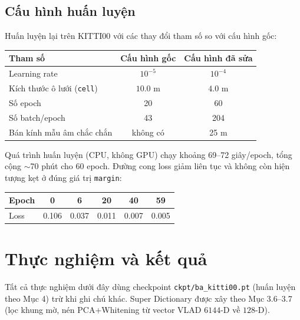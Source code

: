 \documentclass[a4paper,12pt]{article}
\begin{document}
\subsection{Cấu hình huấn luyện}
Huấn luyện lại trên KITTI00 với các thay đổi tham số so với cấu hình gốc:
\begin{center}
\begin{tabular}{lcc}
\toprule
Tham số & Cấu hình gốc & Cấu hình đã sửa \\
\midrule
Learning rate & $10^{-5}$ & $10^{-4}$ \\
Kích thước ô lưới (\texttt{cell}) & $10.0$ m & $4.0$ m \\
Số epoch & 20 & 60 \\
Số batch/epoch & 43 & 204 \\
Bán kính mẫu âm chắc chắn & không có & 25 m \\
\bottomrule
\end{tabular}
\end{center}
Quá trình huấn luyện (CPU, không GPU) chạy khoảng 69--72 giây/epoch, tổng cộng $\sim$70 phút cho 60 epoch. Đường cong loss giảm liên tục và không còn hiện tượng kẹt ở đúng giá trị \texttt{margin}:
\begin{center}
\begin{tabular}{lccccc}
\toprule
Epoch & 0 & 6 & 20 & 40 & 59 \\
\midrule
Loss & 0.106 & 0.037 & 0.011 & 0.007 & 0.005 \\
\bottomrule
\end{tabular}
\end{center}

\section{Thực nghiệm và kết quả}
Tất cả thực nghiệm dưới đây dùng checkpoint \texttt{ckpt/ba\_kitti00.pt} (huấn luyện theo Mục 4) trừ khi ghi chú khác. Super Dictionary được xây theo Mục 3.6--3.7 (lọc khung mờ, nén PCA+Whitening từ vector VLAD $6144$-D về $128$-D).
\end{document}
